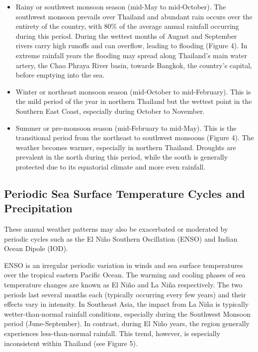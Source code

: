 \begin{itemize}
	\item Rainy or southwest monsoon season (mid-May to mid-October). The southwest monsoon prevails over Thailand and abundant rain occurs over the entirety of the country, with 80\% of the average annual rainfall occurring during this period. During the wettest months of August and September rivers carry high runoffs and can overflow, leading to flooding (Figure 4). In extreme rainfall years the flooding may spread along Thailand's main water artery, the Chao Phraya River basin, towards Bangkok, the country's capital, before emptying into the sea.

\item Winter or northeast monsoon season (mid-October to mid-February). This is the mild period of the year in northern Thailand but the wettest point in the Southern East Coast, especially during October to November.  

\item Summer or pre-monsoon season (mid-February to mid-May). This is the transitional period from the northeast to southwest monsoons (Figure 4). The weather becomes warmer, especially in northern Thailand. Droughts are prevalent in the north during this period, while the south is generally protected due to its equatorial climate and more even rainfall.
\end{itemize}

\subsection{Periodic Sea Surface Temperature Cycles and Precipitation}

These annual weather patterns may also be exacerbated or moderated by periodic cycles such as the El Niño Southern Oscillation (ENSO) and Indian Ocean Dipole (IOD).

ENSO is an irregular periodic variation in winds and sea surface temperatures over the tropical eastern Pacific Ocean. The warming and cooling phases of sea temperature changes are known as El Niño and La Niña respectively. The two periods last several months each (typically occurring every few years) and their effects vary in intensity. In Southeast Asia, the impact from La Ni\~na is typically wetter-than-normal rainfall conditions, especially during the Southwest Monsoon period (June-September). In contrast, during El Niño years, the region generally experiences less-than-normal rainfall. This trend, however,  is especially inconsistent within Thailand (see Figure 5). 

